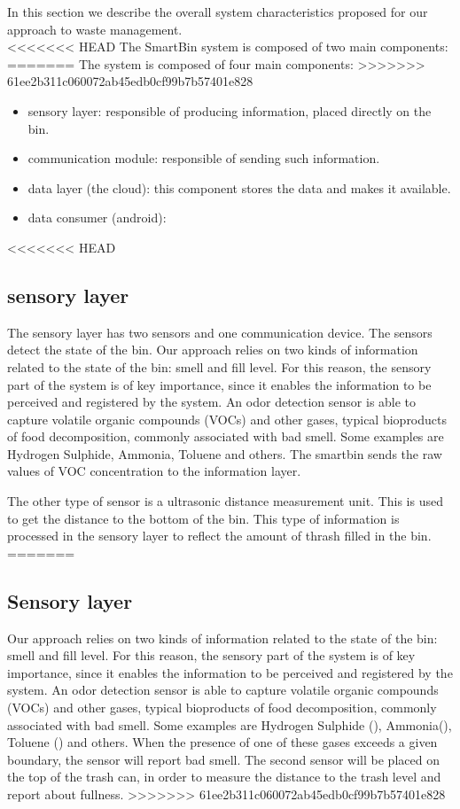 
In this section we describe the overall system characteristics proposed for our approach to waste management.\\
<<<<<<< HEAD
The SmartBin system is composed of two main components:
=======
The system is composed of four main components:
>>>>>>> 61ee2b311c060072ab45edb0cf99b7b57401e828
\begin{itemize}
\item sensory layer: responsible of producing information, placed directly on the bin.
\item communication module: responsible of sending such information.
\item data layer (the cloud): this component stores the data and makes it available.
\item data consumer (android):  
\end{itemize}

<<<<<<< HEAD
\subsection{sensory layer}
The sensory layer has two sensors and one communication device. The sensors detect the state of the bin.
Our approach relies on two kinds of information related to the state of the bin: smell and fill level.
For this reason, the sensory part of the system is of key importance, since it enables the information to be perceived and registered by the system.
An odor detection sensor is able to capture volatile organic compounds (VOCs) and other gases, typical bioproducts of food decomposition, commonly associated with bad smell. 
Some examples are Hydrogen Sulphide, Ammonia, Toluene and others.
The smartbin sends the raw values of VOC concentration to the information layer.

The other type of sensor is a ultrasonic distance measurement unit. This is used to get the distance to the bottom of the bin.
This type of information is processed in the sensory layer to reflect the amount of thrash filled in the bin.
=======
\subsection{Sensory layer}
Our approach relies on two kinds of information related to the state of the bin: smell and fill level.
For this reason, the sensory part of the system is of key importance, since it enables the information to be perceived and registered by the system.
An odor detection sensor is able to capture volatile organic compounds (VOCs) and other gases, typical bioproducts of food decomposition, commonly associated with bad smell. 
Some examples are Hydrogen Sulphide (), Ammonia(), Toluene () and others.
When the presence of one of these gases exceeds a given boundary, the sensor will report bad smell.
The second sensor will be placed on the top of the trash can, in order to measure the distance to the trash level and report about fullness.
>>>>>>> 61ee2b311c060072ab45edb0cf99b7b57401e828

